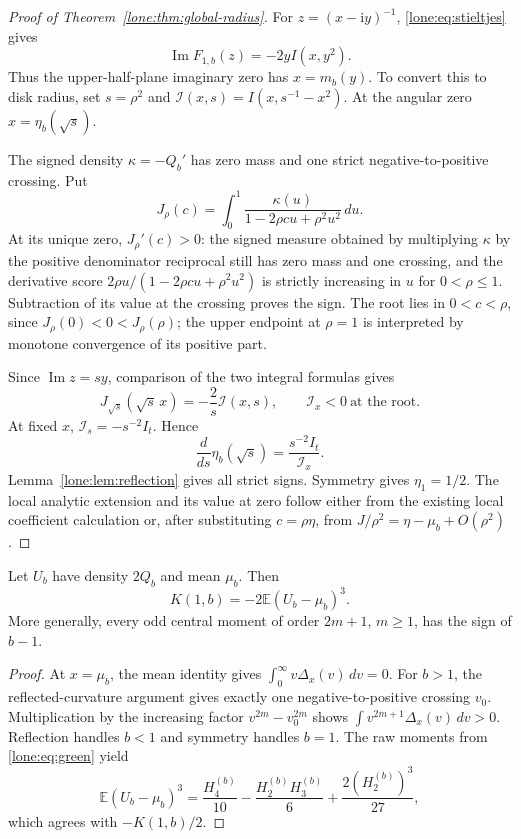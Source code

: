 \begin{proof}[Proof of Theorem~\ref{lone:thm:global-radius}]
For $z=(x-\mathrm i y)^{-1}$, \eqref{lone:eq:stieltjes} gives
\[
 \operatorname{Im}F_{1,b}(z)=-2y I(x,y^2).
\]
Thus the upper-half-plane imaginary zero has $x=m_b(y)$.
To convert this to disk radius, set $s=\rho^2$ and
$\mathcal I(x,s)=I(x,s^{-1}-x^2)$. At the angular zero $x=\eta_b(\sqrt s)$.

The signed density $\kappa=-Q_b'$ has zero mass and one strict
negative-to-positive crossing. Put
\[
 J_\rho(c)=\int_0^1\frac{\kappa(u)}{1-2\rho cu+\rho^2u^2}\,du.
\]
At its unique zero, $J_\rho'(c)>0$: the signed measure obtained by
multiplying $\kappa$ by the positive denominator reciprocal still has
zero mass and one crossing, and the derivative score
$2\rho u/(1-2\rho cu+\rho^2u^2)$ is strictly increasing in $u$ for
$0<\rho\le1$. Subtraction of its value at the crossing proves the sign.
The root lies in $0<c<\rho$, since $J_\rho(0)<0<J_\rho(\rho)$;
the upper endpoint at $\rho=1$ is interpreted by monotone convergence
of its positive part.

Since $\operatorname{Im}z=sy$, comparison of the two integral formulas
gives
\[
 J_{\sqrt s}(\sqrt s\,x)=-\frac2s\mathcal I(x,s),
 \qquad \mathcal I_x<0\ \text{at the root}.
\]
At fixed $x$, $\mathcal I_s=-s^{-2}I_t$. Hence
\begin{equation}\label{lone:eq:radial-derivative}
 \frac d{ds}\eta_b(\sqrt s)=\frac{s^{-2}I_t}{\mathcal I_x}.
\end{equation}
Lemma~\ref{lone:lem:reflection} gives all strict signs. Symmetry gives
$\eta_1=1/2$. The local analytic extension and its value at zero follow
either from the existing local coefficient calculation or, after substituting $c=\rho\eta$, from
$J/\rho^2=\eta-\mu_b+O(\rho^2)$.
\end{proof}

\begin{corollary}
\label{lone:cor:moment}
Let $U_b$ have density $2Q_b$ and mean $\mu_b$. Then
\[
 K(1,b)=-2\mathbb E(U_b-\mu_b)^3.
\]
More generally, every odd central moment of order $2m+1$, $m\ge1$,
has the sign of $b-1$.
\end{corollary}
\begin{proof}
At $x=\mu_b$, the mean identity gives
$\int_0^\infty v\Delta_x(v)\,dv=0$. For $b>1$, the reflected-curvature
argument gives exactly one negative-to-positive crossing $v_0$.
Multiplication by the increasing factor $v^{2m}-v_0^{2m}$ shows
$\int v^{2m+1}\Delta_x(v)\,dv>0$. Reflection handles $b<1$ and symmetry
handles $b=1$. The raw moments from \eqref{lone:eq:green} yield
\[
 \mathbb E(U_b-\mu_b)^3
 =\frac{H_4^{(b)}}{10}
 -\frac{H_2^{(b)}H_3^{(b)}}6
 +\frac{2(H_2^{(b)})^3}{27},
\]
which agrees with $-K(1,b)/2$.
\end{proof}

